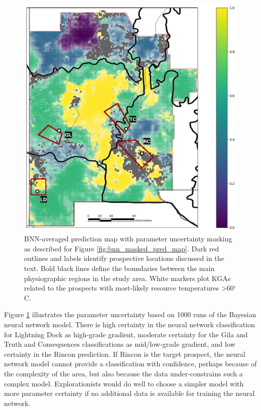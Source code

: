 \begin{figure}
\centering
\includegraphics[width=.75\textwidth]{templates/images/Figure-BNN_All_Gradient_Map_Masked_Prospect_Zones.png}
\caption[Parameter uncertainty map with prospective areas]
{BNN-averaged prediction map with parameter uncertainty masking as described for Figure \ref{fig:bnn_masked_pred_map}. Dark red outlines and labels identify prospective locations discussed in the text. Bold black lines define the boundaries between the main physiographic regions in the study area. White markers plot KGAs related to the prospects with most-likely resource temperatures >60$^\circ$C.}
\label{fig:param_uncertainty_prospects}
\end{figure}

Figure \ref{fig:param_uncertainty_prospects} illustrates the parameter uncertainty based on 1000 runs of the Bayesian neural network model. There is high certainty in the neural network classification for Lightning Dock as high-grade gradient, moderate certainty for the Gila and Truth and Consequences classifications as mid/low-grade gradient, and low certainty in the Rincon prediction. If Rincon is the target prospect, the neural network model cannot provide a classification with confidence, perhaps because of the complexity of the area, but also because the data under-constrains such a complex model. Explorationists would do well to choose a simpler model with more parameter certainty if no additional data is available for training the neural network.

